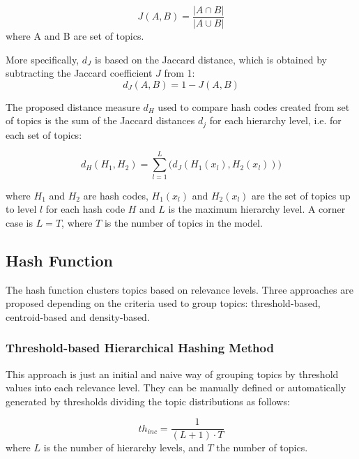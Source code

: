 \begin{equation}
J(A,B) = \frac{ | A \cap B |}{ | A \cup B |}
\label{eq:jc}
\end{equation}
where A and B are set of topics. 

More specifically, $d_J$ is based on the Jaccard distance, which is obtained by subtracting the Jaccard coefficient $J$ from 1:
\begin{equation}
d_J(A,B) = 1 - J(A,B)
\label{eq:dj}
\end{equation}

The proposed distance measure $d_H$ used to compare hash codes created from set of topics is the sum of the Jaccard distances $d_j$ for each hierarchy level, i.e. for each set of topics:

\begin{equation}
d_H(H_1,H_2) = \sum\limits_{l=1}^L \Big( d_J(H_1(x_l),H_2(x_l)) \Big)
\label{eq:dh}
\end{equation}

where $H_1$ and $H_2$ are hash codes, $H_1(x_l)$ and $H_2(x_l)$ are the set of topics up to level $l$ for each hash code $H$ and $L$ is the maximum hierarchy level. A corner case is $L=T$, where $T$ is the number of topics in the model. 


\subsection{Hash Function}
\label{sec:comparison-hash}

The hash function clusters topics based on relevance levels. Three approaches are proposed depending on the criteria used to group topics: threshold-based, centroid-based and density-based.

\subsubsection{Threshold-based Hierarchical Hashing Method}
\label{sec:comparison-threshold}
This approach is just an initial and naive way of grouping topics by threshold values into each relevance level. They can be manually defined or automatically generated by thresholds dividing the topic distributions as follows:

\begin{equation}
th_{inc} = \frac{1}{(L+1) \cdot T}
\label{eq:th}
\end{equation}
where $L$ is the number of hierarchy levels, and $T$ the number of topics.

